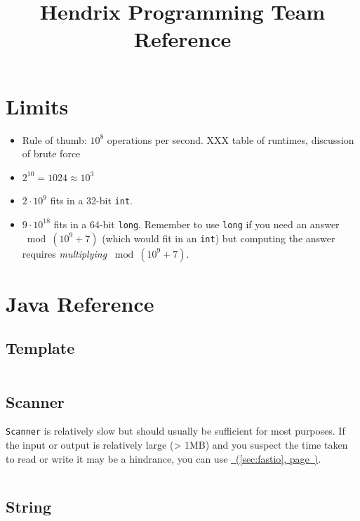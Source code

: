 \documentclass[10pt]{article}
\newcommand{\code}[1]{\inputminted[fontsize=\normalsize]{java}{code/#1}}
\newcommand*{\fulllink}[1]{\hyperref[{#1}]{\nameref*{#1}~(\ref*{#1}, page~\pageref*{#1})}}
\begin{document}
\title{Hendrix Programming Team Reference}

\maketitle

\tableofcontents
\newpage

\section{Limits}

\begin{itemize}
\item Rule of thumb: $10^8$ operations per second.
  XXX table of runtimes, discussion of brute force
\item $2^{10} = 1024 \approx 10^3$
\item $2 \cdot 10^9$ fits in a 32-bit \texttt{int}.
\item $9 \cdot 10^{18}$ fits in a 64-bit \texttt{long}.  Remember to
  use \texttt{long} if you need an answer $\bmod (10^9 + 7)$ (which
  would fit in an \texttt{int}) but computing the answer requires
  \emph{multiplying} $\bmod (10^9 + 7)$.
\end{itemize}

\section{Java Reference}

\subsection{Template}

\code{java/Template.java}

\subsection{Scanner}

\texttt{Scanner} is relatively slow but should usually be sufficient
for most purposes.  If the input or output is relatively large (> 1MB)
and you suspect the time taken to read or write it may be a hindrance,
you can use \fulllink{sec:fastio}.

\code{java/ScannerExample.java}

\subsection{String}
\end{document}
